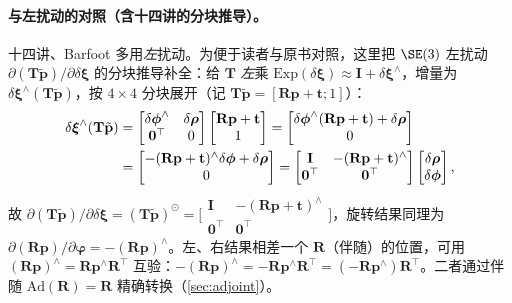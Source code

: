 \paragraph{与左扰动的对照（含十四讲的分块推导）。}十四讲、Barfoot 多用\emph{左}扰动。为便于读者与原书对照，这里把 $\SE(3)$ 左扰动 $\partial(\mathbf{T}\tilde{\mathbf{p}})/\partial\delta\boldsymbol{\xi}$ 的分块推导补全：给 $\mathbf{T}$ \emph{左}乘 $\mathrm{Exp}(\delta\boldsymbol{\xi})\approx\mathbf{I}+\delta\boldsymbol{\xi}^\wedge$，增量为 $\delta\boldsymbol{\xi}^\wedge(\mathbf{T}\tilde{\mathbf{p}})$，按 $4\times4$ 分块展开（记 $\mathbf{T}\tilde{\mathbf{p}}=[\mathbf{R}\mathbf{p}+\mathbf{t};1]$）：
\begin{align}
  \delta\boldsymbol{\xi}^\wedge(\mathbf{T}\tilde{\mathbf{p}})
  &=\begin{bmatrix}\delta\boldsymbol{\phi}^\wedge&\delta\boldsymbol{\rho}\\\mathbf{0}^\top&0\end{bmatrix}
    \begin{bmatrix}\mathbf{R}\mathbf{p}+\mathbf{t}\\1\end{bmatrix}
   =\begin{bmatrix}\delta\boldsymbol{\phi}^\wedge(\mathbf{R}\mathbf{p}+\mathbf{t})+\delta\boldsymbol{\rho}\\0\end{bmatrix}\notag\\
  &=\begin{bmatrix}-(\mathbf{R}\mathbf{p}+\mathbf{t})^\wedge\delta\boldsymbol{\phi}+\delta\boldsymbol{\rho}\\0\end{bmatrix}
   =\begin{bmatrix}\mathbf{I}&-(\mathbf{R}\mathbf{p}+\mathbf{t})^\wedge\\\mathbf{0}^\top&\mathbf{0}^\top\end{bmatrix}
    \begin{bmatrix}\delta\boldsymbol{\rho}\\\delta\boldsymbol{\phi}\end{bmatrix},
  \label{eq:left-pert-se3}
\end{align}
故 $\partial(\mathbf{T}\tilde{\mathbf{p}})/\partial\delta\boldsymbol{\xi}=(\mathbf{T}\tilde{\mathbf{p}})^\odot=\big[\begin{smallmatrix}\mathbf{I}&-(\mathbf{R}\mathbf{p}+\mathbf{t})^\wedge\\\mathbf{0}^\top&\mathbf{0}^\top\end{smallmatrix}\big]$，旋转结果同理为 $\partial(\mathbf{R}\mathbf{p})/\partial\boldsymbol{\varphi}=-(\mathbf{R}\mathbf{p})^\wedge$。左、右结果相差一个 $\mathbf{R}$（伴随）的位置，可用 $(\mathbf{R}\mathbf{p})^\wedge=\mathbf{R}\mathbf{p}^\wedge\mathbf{R}^\top$ 互验：$-(\mathbf{R}\mathbf{p})^\wedge=-\mathbf{R}\mathbf{p}^\wedge\mathbf{R}^\top=(-\mathbf{R}\mathbf{p}^\wedge)\mathbf{R}^\top$。二者通过伴随 $\mathrm{Ad}(\mathbf{R})=\mathbf{R}$ 精确转换（\cref{sec:adjoint}）。

